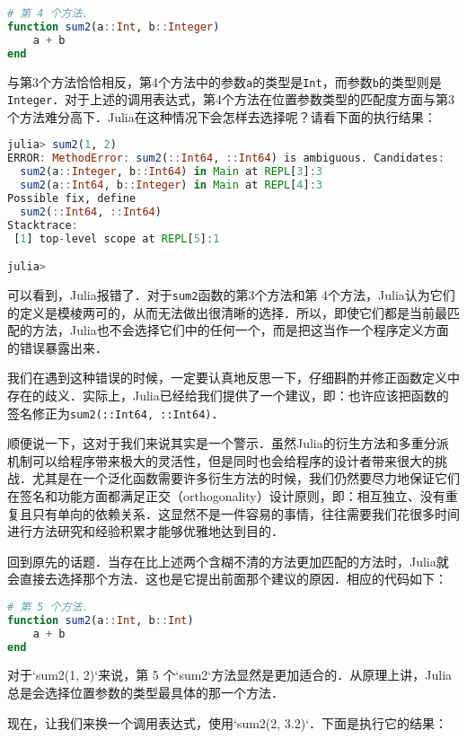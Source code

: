 \begin{lstlisting}[language=julia]
# 第 4 个方法．
function sum2(a::Int, b::Integer)
    a + b
end
\end{lstlisting}

与第3个方法恰恰相反，第4个方法中的参数\verb|a|的类型是\verb|Int|，而参数\verb|b|的类型则是\verb|Integer|．对于上述的调用表达式，第4个方法在位置参数类型的匹配度方面与第3个方法难分高下．Julia在这种情况下会怎样去选择呢？请看下面的执行结果：

\begin{lstlisting}[language=julia]
julia> sum2(1, 2)
ERROR: MethodError: sum2(::Int64, ::Int64) is ambiguous. Candidates:
  sum2(a::Integer, b::Int64) in Main at REPL[3]:3
  sum2(a::Int64, b::Integer) in Main at REPL[4]:3
Possible fix, define
  sum2(::Int64, ::Int64)
Stacktrace:
 [1] top-level scope at REPL[5]:1

julia> 
\end{lstlisting}

可以看到，Julia报错了．对于\verb|sum2|函数的第3个方法和第 4个方法，Julia认为它们的定义是模棱两可的，从而无法做出很清晰的选择．所以，即使它们都是当前最匹配的方法，Julia也不会选择它们中的任何一个，而是把这当作一个程序定义方面的错误暴露出来．

我们在遇到这种错误的时候，一定要认真地反思一下，仔细斟酌并修正函数定义中存在的歧义．实际上，Julia已经给我们提供了一个建议，即：也许应该把函数的签名修正为\verb|sum2(::Int64, ::Int64)|．

顺便说一下，这对于我们来说其实是一个警示．虽然Julia的衍生方法和多重分派机制可以给程序带来极大的灵活性，但是同时也会给程序的设计者带来很大的挑战．尤其是在一个泛化函数需要许多衍生方法的时候，我们仍然要尽力地保证它们在签名和功能方面都满足正交（orthogonality）设计原则，即：相互独立、没有重复且只有单向的依赖关系．这显然不是一件容易的事情，往往需要我们花很多时间进行方法研究和经验积累才能够优雅地达到目的．

回到原先的话题．当存在比上述两个含糊不清的方法更加匹配的方法时，Julia就会直接去选择那个方法．这也是它提出前面那个建议的原因．相应的代码如下：

\begin{lstlisting}[language=julia]
# 第 5 个方法．
function sum2(a::Int, b::Int)
    a + b
end
\end{lstlisting}

对于`sum2(1, 2)`来说，第 5 个`sum2`方法显然是更加适合的．从原理上讲，Julia 总是会选择位置参数的类型最具体的那一个方法．

现在，让我们来换一个调用表达式，使用`sum2(2, 3.2)`．下面是执行它的结果：

